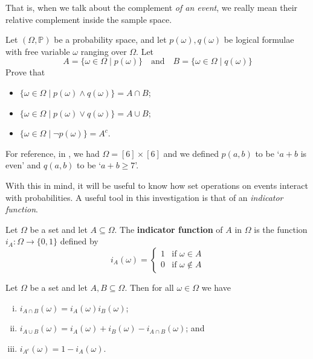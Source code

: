 That is, when we talk about the complement \textit{of an event}, we really mean their relative complement inside the sample space.

\begin{exercise}
\label{exFormalOrAndNot}
Let $(\Omega, \mathbb{P})$ be a probability space, and let $p(\omega),q(\omega)$ be logical formulae with free variable $\omega$ ranging over $\Omega$. Let
\[ A = \{ \omega \in \Omega \mid p(\omega) \} \quad \text{and} \quad B = \{ \omega \in \Omega \mid q(\omega) \} \]
Prove that
\begin{itemize}
\item $\{ \omega \in \Omega \mid p(\omega) \wedge q(\omega) \} = A \cap B$;
\item $\{ \omega \in \Omega \mid p(\omega) \vee q(\omega) \} = A \cup B$;
\item $\{ \omega \in \Omega \mid \neg p(\omega) \} = A^c$.
\end{itemize}
For reference, in , we had $\Omega = [6] \times [6]$ and we defined $p(a,b)$ to be `$a+b$ is even' and $q(a,b)$ to be `$a+b \ge 7$'.
\end{exercise}

With this in mind, it will be useful to know how set operations on events interact with probabilities. A useful tool in this investigation is that of an \textit{indicator function}.

\begin{definition}
\label{defIndicatorFunction}
Let $\Omega$ be a set and let $A \subseteq \Omega$. The \textbf{indicator function} of $A$ in $\Omega$ is the function $i_A : \Omega \to \{ 0,1 \}$ defined by
\[ i_A(\omega) = \begin{cases} 1 & \text{if } \omega \in A \\ 0 & \text{if } \omega \not \in A \end{cases} \]
\end{definition}

\begin{proposition}
\label{propIndicatorFunctionSetOperations}
Let $\Omega$ be a set and let $A,B \subseteq \Omega$. Then for all $\omega \in \Omega$ we have
\begin{enumerate}[(i)]
\item $i_{A \cap B}(\omega) = i_A(\omega)i_B(\omega)$;
\item $i_{A \cup B}(\omega) = i_A(\omega) + i_B(\omega) - i_{A \cap B}(\omega)$; and
\item $i_{A^c}(\omega) = 1 - i_A(\omega)$.
\end{enumerate}
\end{proposition}

